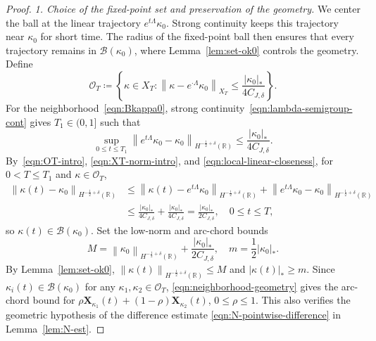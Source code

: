 \documentclass[11pt,reqno]{amsart}
\theoremstyle{plain}
\theoremstyle{definition}
\numberwithin{equation}{section}
\newcommand{\mc}[1]{\mathcal{#1}}
\newcommand{\bm}[1]{\boldsymbol{#1}}
\newcommand{\abs}[1]{\left\lvert #1 \right\rvert}
\newcommand{\norm}[1]{\left\lVert #1 \right\rVert}
\newcommand{\R}{\mathbb{R}}
\newcommand{\xka}[1]{\bm X_{\kappa_{#1}}}
\newcommand{\hr}[1]{H^{#1}(\R)}
\begin{document}
\begin{proof}
\emph{1. Choice of the fixed-point set and preservation of the geometry.}
We center the ball at the linear trajectory $e^{t\Lambda}\kappa_0$.
Strong continuity keeps this trajectory near $\kappa_0$ for short time.
The radius of the fixed-point ball then ensures that every trajectory remains
in $\mc B(\kappa_0)$, where Lemma~\ref{lem:set-ok0} controls the geometry. Define
\begin{equation}\label{eqn:OT-intro}
    \mc O_T
    \coloneqq
    \left\{
    \kappa\in X_T:
    \norm{\kappa-e^{\cdot\Lambda}\kappa_0}_{X_T}
    \le \frac{\abs{\kappa_0}_*}{4C_{J,\delta}}
    \right\}.
\end{equation}
For the neighborhood~\eqref{eqn:Bkappa0}, strong
continuity~\eqref{eqn:lambda-semigroup-cont} gives $T_1\in(0,1]$ such that
\begin{equation}\label{eqn:local-linear-closeness}
    \sup_{0\le t\le T_1}
    \norm{e^{t\Lambda}\kappa_0-\kappa_0}_{\hr{-\frac12+\delta}}
    \le \frac{\abs{\kappa_0}_*}{4C_{J,\delta}}.
\end{equation}
By~\eqref{eqn:OT-intro}, \eqref{eqn:XT-norm-intro}, and
\eqref{eqn:local-linear-closeness}, for $0<T\le T_1$ and $\kappa\in\mc O_T$,
\begin{equation}
    \begin{aligned}
        \norm{\kappa(t)-\kappa_0}_{\hr{-\frac12+\delta}}
        &\le \norm{\kappa(t)-e^{t\Lambda}\kappa_0}_{\hr{-\frac12+\delta}}
        +\norm{e^{t\Lambda}\kappa_0-\kappa_0}_{\hr{-\frac12+\delta}}\\
        &\le \frac{\abs{\kappa_0}_*}{4C_{J,\delta}}
        +\frac{\abs{\kappa_0}_*}{4C_{J,\delta}}
        =\frac{\abs{\kappa_0}_*}{2C_{J,\delta}},
        \quad 0\le t\le T,
    \end{aligned}
\end{equation}
so $\kappa(t)\in\mc B(\kappa_0)$. Set the low-norm and arc-chord bounds
\begin{equation}
    M=\norm{\kappa_0}_{\hr{-\frac12+\delta}}
      +\frac{\abs{\kappa_0}_*}{2C_{J,\delta}},
    \quad
    m=\frac12\abs{\kappa_0}_*.
\end{equation}
By Lemma~\ref{lem:set-ok0},
$\norm{\kappa(t)}_{\hr{-\frac12+\delta}}\le M$ and
$\abs{\kappa(t)}_*\ge m$.
Since $\kappa_i(t)\in\mc B(\kappa_0)$ for any
$\kappa_1,\kappa_2\in\mc O_T$, \eqref{eqn:neighborhood-geometry} gives the arc-chord bound
for $\rho\xka{1}(t)+(1-\rho)\xka{2}(t)$, $0\le\rho\le1$.
This also verifies the geometric hypothesis of the difference estimate
\eqref{eqn:N-pointwise-difference} in Lemma~\ref{lem:N-est}.


\end{proof}
\end{document}
